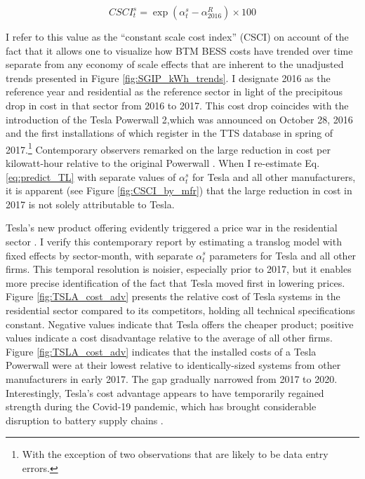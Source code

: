 \documentclass[preprint,12pt,authoryear]{elsarticle}
\begin{document}
\begin{equation}\label{eq:CSCI}
	CSCI^{s}_t = \exp(\alpha^{s}_{t} - \alpha^{R}_{2016}) \times 100
\end{equation}

I refer to this value as the ``constant scale cost index'' (CSCI) on account of the fact that it allows one to visualize how BTM BESS costs have trended over time separate from any economy of scale effects that are inherent to the unadjusted trends presented in Figure \ref{fig:SGIP_kWh_trends}. I designate 2016 as the reference year and residential as the reference sector in light of the precipitous drop in cost in that sector from 2016 to 2017. This cost drop coincides with the introduction of the Tesla Powerwall 2,which was announced on October 28, 2016 and the first installations of which register in the TTS database in spring of 2017.\footnote{With the exception of two observations that are likely to be data entry errors.} Contemporary observers remarked on the large reduction in cost per kilowatt-hour relative to the original Powerwall \citep{lambert2016a,vorrath2016}. When I re-estimate Eq. \ref{eq:predict_TL} with separate values of $\alpha^{s}_{t}$ for Tesla and all other manufacturers, it is apparent (see Figure \ref{fig:CSCI_by_mfr}) that the large reduction in cost in 2017 is not solely attributable to Tesla.

Tesla's new product offering evidently triggered a price war in the residential sector \citep{peacock2017}. I verify this contemporary report by estimating a translog model with fixed effects by sector-month, with separate $\alpha^{s}_{t}$  parameters for Tesla and all other firms. This temporal resolution is noisier, especially prior to 2017, but it enables more precise identification of the fact that Tesla moved first in lowering prices. Figure \ref{fig:TSLA_cost_adv} presents the relative cost of Tesla systems in the residential sector compared to its competitors, holding all technical specifications constant. Negative values indicate that Tesla offers the cheaper product; positive values indicate a cost disadvantage relative to the average of all other firms. Figure \ref{fig:TSLA_cost_adv} indicates that the installed costs of a Tesla Powerwall were at their lowest relative to identically-sized systems from other manufacturers in early 2017. The gap gradually narrowed from 2017 to 2020. Interestingly, Tesla's cost advantage appears to have temporarily regained strength during the Covid-19 pandemic, which has brought considerable disruption to battery supply chains \citep{dyatkin2020}.
\end{document}
